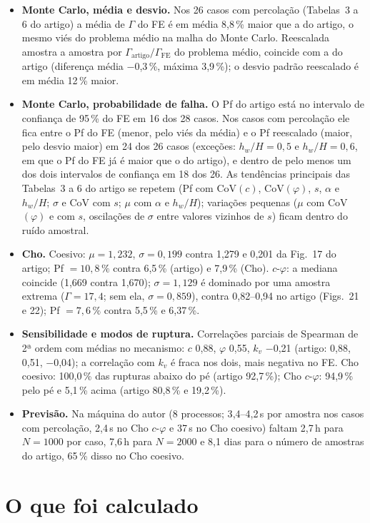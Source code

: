 \documentclass[11pt,a4paper]{article}
\newcommand{\Gam}{\Gamma}
\newcommand{\Gart}{\Gamma_{\mathrm{artigo}}}
\newcommand{\Gfe}{\Gamma_{\mathrm{FE}}}
\begin{document}
\begin{itemize}
\item \textbf{Monte Carlo, média e desvio.} Nos 26 casos com percolação (Tabelas~3 a 6 do artigo) a média de $\Gam$ do FE é em média 8{,}8\,\% maior que a do artigo, o mesmo viés do problema médio na malha do Monte Carlo. Reescalada amostra a amostra por $\Gart/\Gfe$ do problema médio, coincide com a do artigo (diferença média $-$0{,}3\,\%, máxima 3{,}9\,\%); o desvio padrão reescalado é em média 12\,\% maior.
\item \textbf{Monte Carlo, probabilidade de falha.} O Pf do artigo está no intervalo de confiança de 95\,\% do FE em 16 dos 28 casos. Nos casos com percolação ele fica entre o Pf do FE (menor, pelo viés da média) e o Pf reescalado (maior, pelo desvio maior) em 24 dos 26 casos (exceções: $h_w/H = 0{,}5$ e $h_w/H = 0{,}6$, em que o Pf do FE já é maior que o do artigo), e dentro de pelo menos um dos dois intervalos de confiança em 18 dos 26. As tendências principais das Tabelas~3 a 6 do artigo se repetem (Pf com CoV$(c)$, CoV$(\varphi)$, $s$, $\alpha$ e $h_w/H$; $\sigma$ e CoV com $s$; $\mu$ com $\alpha$ e $h_w/H$); variações pequenas ($\mu$ com CoV$(\varphi)$ e com $s$, oscilações de $\sigma$ entre valores vizinhos de $s$) ficam dentro do ruído amostral.
\item \textbf{Cho.} Coesivo: $\mu = 1{,}232$, $\sigma = 0{,}199$ contra 1{,}279 e 0{,}201 da Fig.~17 do artigo; Pf $= 10{,}8\,\%$ contra 6,5\,\% (artigo) e 7,9\,\% (Cho). $c$-$\varphi$: a mediana coincide (1{,}669 contra 1{,}670); $\sigma = 1{,}129$ é dominado por uma amostra extrema ($\Gam = 17{,}4$; sem ela, $\sigma = 0{,}859$), contra 0{,}82--0{,}94 no artigo (Figs.~21 e 22); Pf $= 7{,}6\,\%$ contra 5,5\,\% e 6,37\,\%.
\item \textbf{Sensibilidade e modos de ruptura.} Correlações parciais de Spearman de 2ª ordem com médias no mecanismo: $c$ 0{,}88, $\varphi$ 0{,}55, $k_v$ $-$0{,}21 (artigo: 0,88, 0,51, $-$0,04); a correlação com $k_v$ é fraca nos dois, mais negativa no FE.
Cho coesivo: 100{,}0\,\% das rupturas abaixo do pé (artigo 92,7\,\%); Cho $c$-$\varphi$: 94{,}9\,\% pelo pé e 5{,}1\,\% acima (artigo 80,8\,\% e 19,2\,\%).
\item \textbf{Previsão.} Na máquina do autor (8 processos; 3{,}4--4{,}2\,s por amostra nos casos com percolação, 2{,}4\,s no Cho $c$-$\varphi$ e 37\,s no Cho coesivo) faltam 2{,}7\,h para $N = 1000$ por caso, 7{,}6\,h para $N = 2000$ e 8{,}1 dias para o número de amostras do artigo, 65\,\% disso no Cho coesivo.
\end{itemize}
\section{O que foi calculado}
\end{document}
